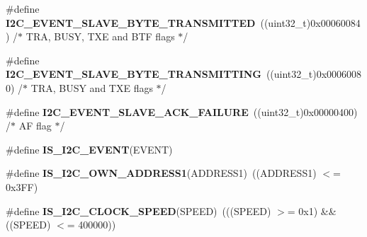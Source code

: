 \begin{DoxyCompactItemize}
\item 
\#define \textbf{ I2\+C\+\_\+\+E\+V\+E\+N\+T\+\_\+\+S\+L\+A\+V\+E\+\_\+\+B\+Y\+T\+E\+\_\+\+T\+R\+A\+N\+S\+M\+I\+T\+T\+ED}~((uint32\+\_\+t)0x00060084)  /$\ast$ T\+R\+A, B\+U\+S\+Y, T\+X\+E and B\+T\+F flags $\ast$/
\item 
\#define \textbf{ I2\+C\+\_\+\+E\+V\+E\+N\+T\+\_\+\+S\+L\+A\+V\+E\+\_\+\+B\+Y\+T\+E\+\_\+\+T\+R\+A\+N\+S\+M\+I\+T\+T\+I\+NG}~((uint32\+\_\+t)0x00060080)  /$\ast$ T\+R\+A, B\+U\+S\+Y and T\+X\+E flags $\ast$/
\item 
\#define \textbf{ I2\+C\+\_\+\+E\+V\+E\+N\+T\+\_\+\+S\+L\+A\+V\+E\+\_\+\+A\+C\+K\+\_\+\+F\+A\+I\+L\+U\+RE}~((uint32\+\_\+t)0x00000400)  /$\ast$ A\+F flag $\ast$/
\item 
\#define \textbf{ I\+S\+\_\+\+I2\+C\+\_\+\+E\+V\+E\+NT}(E\+V\+E\+NT)
\item 
\#define \textbf{ I\+S\+\_\+\+I2\+C\+\_\+\+O\+W\+N\+\_\+\+A\+D\+D\+R\+E\+S\+S1}(A\+D\+D\+R\+E\+S\+S1)~((A\+D\+D\+R\+E\+S\+S1) $<$= 0x3\+F\+F)
\item 
\#define \textbf{ I\+S\+\_\+\+I2\+C\+\_\+\+C\+L\+O\+C\+K\+\_\+\+S\+P\+E\+ED}(S\+P\+E\+ED)~(((S\+P\+E\+ED) $>$= 0x1) \&\& ((\+S\+P\+E\+E\+D) $<$= 400000))
\end{DoxyCompactItemize}
